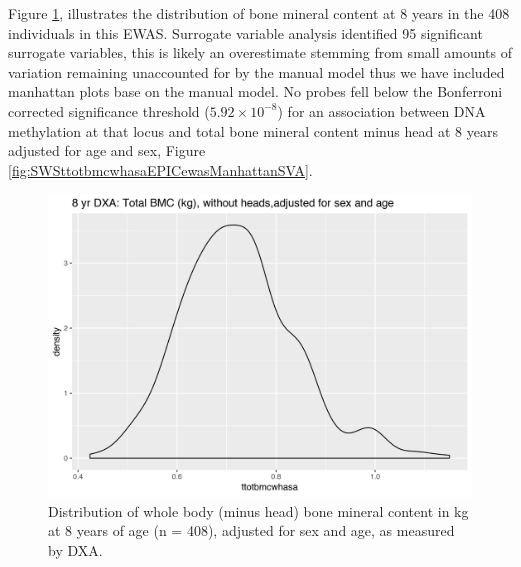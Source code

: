 \documentclass[
]{book}
\begin{document}
Figure \ref{fig:SWSttotbmcwhasa}, illustrates the distribution of bone mineral content at 8 years in the 408 individuals in this EWAS.
Surrogate variable analysis identified 95 significant surrogate variables, this is likely an overestimate stemming from small amounts of variation remaining unaccounted for by the manual model thus we have included manhattan plots base on the manual model.
No probes fell below the Bonferroni corrected significance threshold (\(5.92\times10^{-8}\)) for an association between DNA methylation at that locus and total bone mineral content minus head at 8 years adjusted for age and sex, Figure \ref{fig:SWSttotbmcwhasaEPICewasManhattanSVA}.

\begin{figure}

{\centering \includegraphics[width=0.8\linewidth]{figs/SWS8yrBMCdist} 

}

\caption{Distribution of whole body (minus head) bone mineral content in kg at 8 years of age (n = 408), adjusted for sex and age, as measured by DXA.}\label{fig:SWSttotbmcwhasa}
\end{figure}
\end{document}
